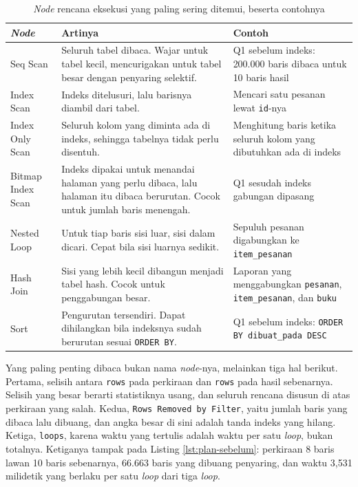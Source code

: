 \begin{table}[!htb]
  \centering
  \caption{\textit{Node} rencana eksekusi yang paling sering ditemui, beserta
           contohnya}
  \label{tab:simpul}
  \begin{tabularx}{\textwidth}{lXX}
    \hline
    \textbf{\textit{Node}} & \textbf{Artinya} & \textbf{Contoh} \\
    \hline
    Seq Scan & Seluruh tabel dibaca. Wajar untuk tabel kecil, mencurigakan untuk tabel besar dengan penyaring selektif. & Q1 sebelum indeks: 200.000 baris dibaca untuk 10 baris hasil \\
    \hline
    Index Scan & Indeks ditelusuri, lalu barisnya diambil dari tabel. & Mencari satu pesanan lewat \texttt{id}-nya \\
    \hline
    Index Only Scan & Seluruh kolom yang diminta ada di indeks, sehingga tabelnya tidak perlu disentuh. & Menghitung baris ketika seluruh kolom yang dibutuhkan ada di indeks \\
    \hline
    Bitmap Index Scan & Indeks dipakai untuk menandai halaman yang perlu dibaca, lalu halaman itu dibaca berurutan. Cocok untuk jumlah baris menengah. & Q1 sesudah indeks gabungan dipasang \\
    \hline
    Nested Loop & Untuk tiap baris sisi luar, sisi dalam dicari. Cepat bila sisi luarnya sedikit. & Sepuluh pesanan digabungkan ke \texttt{item\_pesanan} \\
    \hline
    Hash Join & Sisi yang lebih kecil dibangun menjadi tabel hash. Cocok untuk penggabungan besar. & Laporan yang menggabungkan \texttt{pesanan}, \texttt{item\_pesanan}, dan \texttt{buku} \\
    \hline
    Sort & Pengurutan tersendiri. Dapat dihilangkan bila indeksnya sudah berurutan sesuai \texttt{ORDER BY}. & Q1 sebelum indeks: \texttt{ORDER BY dibuat\_pada DESC} \\
    \hline
  \end{tabularx}
\end{table}

Yang paling penting dibaca bukan nama \textit{node}-nya, melainkan tiga hal berikut.
Pertama, selisih antara \texttt{rows} pada perkiraan dan \texttt{rows} pada
hasil sebenarnya. Selisih yang besar berarti statistiknya usang, dan seluruh
rencana disusun di atas perkiraan yang salah. Kedua, \texttt{Rows Removed by
Filter}, yaitu jumlah baris yang dibaca lalu dibuang, dan angka besar di sini
adalah tanda indeks yang hilang. Ketiga, \texttt{loops}, karena waktu yang
tertulis adalah waktu per satu \textit{loop}, bukan totalnya. Ketiganya
tampak pada Listing \ref{lst:plan-sebelum}: perkiraan 8 baris lawan 10 baris
sebenarnya, 66.663 baris yang dibuang penyaring, dan waktu 3,531 milidetik
yang berlaku per satu \textit{loop} dari tiga \textit{loop}.

